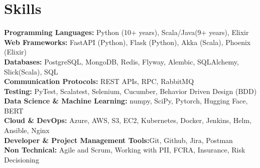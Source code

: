 \documentclass[letterpaper,10pt]{article}
\begin{document}
%
\section{Skills}

 \begin{itemize}[leftmargin=0.15in, label={}]
    \small{\item{
     \textbf{Programming Languages:}{ Python (10+ years), Scala/Java(9+ years), Elixir} \\
     \textbf{Web Frameworks:}{ FastAPI (Python), Flask (Python), Akka (Scala), Phoenix (Elixir) } \\
     \textbf{Databases:}{ PostgreSQL, MongoDB, Redis, Flyway, Alembic, SQLAlchemy, Slick(Scala), SQL} \\
     \textbf{Communication Protocols:}{ REST APIs, RPC, RabbitMQ} \\
     \textbf{Testing:}{ PyTest, Scalatest, Selenium, Cucumber, Behavior Driven Design (BDD)} \\
     \textbf{Data Science \& Machine Learning:}{ numpy, SciPy, Pytorch, Hugging Face, BERT}\\
     \textbf{Cloud \& DevOps:}{ Azure, AWS, S3, EC2, Kubernetes, Docker, Jenkins, Helm, Ansible, Nginx} \\
     \textbf{Developer \& Project Management Tools:}{Git, Github, Jira, Postman} \\
     \textbf{Non Technical:}{ Agile and Scrum, Working with PII, FCRA, Insurance, Risk Decisioning} \\
    }}
 \end{itemize}


\end{document}
